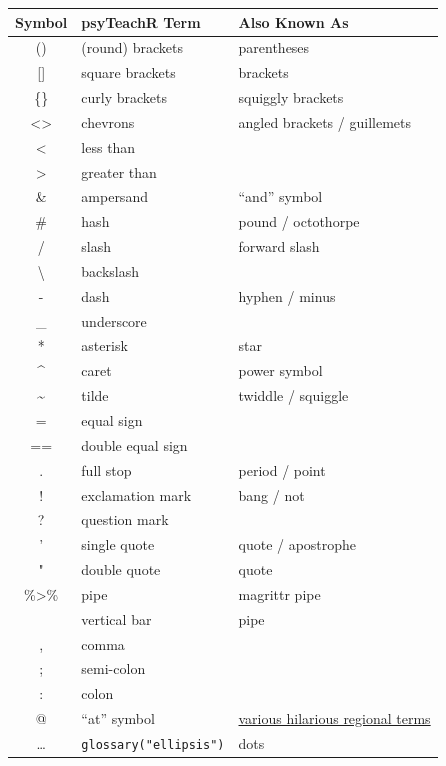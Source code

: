 \documentclass[
  oneside]{book}
\begin{document}
\begin{longtable}[]{@{}cll@{}}
\toprule
Symbol & psyTeachR Term & Also Known As \\
\midrule
\endhead
() & (round) brackets & parentheses \\
{[}{]} & square brackets & brackets \\
\{\} & curly brackets & squiggly brackets \\
\textless\textgreater{} & chevrons & angled brackets / guillemets \\
\textless{} & less than & \\
\textgreater{} & greater than & \\
\& & ampersand & ``and'' symbol \\
\# & hash & pound / octothorpe \\
/ & slash & forward slash \\
\textbackslash{} & backslash & \\
- & dash & hyphen / minus \\
\_ & underscore & \\
* & asterisk & star \\
\^{} & caret & power symbol \\
\textasciitilde{} & tilde & twiddle / squiggle \\
= & equal sign & \\
== & double equal sign & \\
. & full stop & period / point \\
! & exclamation mark & bang / not \\
? & question mark & \\
' & single quote & quote / apostrophe \\
" & double quote & quote \\
\%\textgreater\% & pipe & magrittr pipe \\
\textbar{} & vertical bar & pipe \\
, & comma & \\
; & semi-colon & \\
: & colon & \\
@ & ``at'' symbol & \href{https://www.theguardian.com/notesandqueries/query/0,5753,-1773,00.html}{various hilarious regional terms} \\
\ldots{} & \texttt{glossary("ellipsis")} & dots \\
\bottomrule
\end{longtable}
\end{document}
